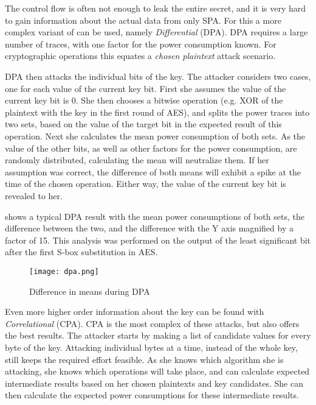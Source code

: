 The control flow is often not enough to leak the entire secret, and it is very hard to gain information about the actual data from only SPA.
For this a more complex variant of \poweranalysis{} can be used, namely \emph{Differential \poweranalysis{}} (DPA).
DPA requires a large number of traces, with one factor for the power consumption known.
For cryptographic operations this equates a \emph{chosen plaintext} attack scenario.

DPA then attacks the individual bits of the key.
The attacker considers two cases, one for each value of the current key bit.
First she assumes the value of the current key bit is 0.
She then chooses a bitwise operation (e.g. XOR of the plaintext with the key in the first round of AES), and splits the power traces into two sets, based on the value of the target bit in the expected result of this operation.
Next she calculates the mean power consumption of both sets.
As the value of the other bits, as well as other factors for the power consumption, are randomly distributed, calculating the mean will neutralize them.
If her assumption was correct, the difference of both means will exhibit a spike at the time of the chosen operation.
Either way, the value of the current key bit is revealed to her.

 shows a typical DPA result with the mean power consumptions of both sets, the difference between the two, and the difference with the Y axis magnified by a factor of 15.
This analysis was performed on the output of the least significant bit after the first S-box substitution in AES.

\begin{figure}[h]
  \centering
  \texttt{[image: dpa.png]}
  \caption{Difference in means during DPA\cite{kocher2011introduction}}
  \label{fig:dpa}
\end{figure}

Even more higher order information about the key can be found with \emph{Correlational \poweranalysis{}} (CPA).
CPA is the most complex of these attacks, but also offers the best results.
The attacker starts by making a list of candidate values for every byte of the key.
Attacking individual bytes at a time, instead of the whole key, still keeps the required effort feasible.
As she knows which algorithm she is attacking, she knows which operations will take place, and can calculate expected intermediate results based on her chosen plaintexts and key candidates.
She can then calculate the expected power consumptions for these intermediate results.

